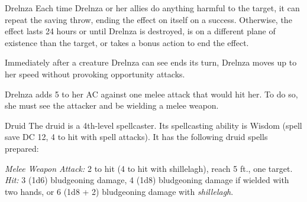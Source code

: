 \documentclass[10pt,a4paper,twoside,bg=print,twocolumn,openany,nodeprecatedcode]{dndbook}
\begin{document}
\begin{DndMonster}[float=t]{Drelnza}
Each time Drelnza or her allies do anything harmful to the target, it can repeat the saving throw, ending the effect on itself on a success. Otherwise, the effect lasts 24 hours or until Drelnza is destroyed, is on a different plane of existence than the target, or takes a bonus action to end the effect.

Immediately after a creature Drelnza can see ends its turn, Drelnza moves up to her speed without provoking opportunity attacks.

Drelnza adds 5 to her AC against one melee attack that would hit her. To do so, she must see the attacker and be wielding a melee weapon.

\end{DndMonster}



\begin{DndMonster}[float=t]{Druid}
\DndMonsterBasics[
armor-class = {11 (16 with \textit{barkskin})},
hit-points = {\DndDice{5d8 + 5}},
speed = {30 ft.}
]
\DndMonsterAbilityScores[
 str = 10,
 dex = 12,
 con = 13,
 int = 12,
 wis = 15,
 cha = 11
]
\DndMonsterDetails[
skills = {Medicine +4, Nature +3, Perception +4},
languages = {Druidic plus any two languages},
challenge = 2,
]
The druid is a 4th-level spellcaster. Its spellcasting ability is Wisdom (spell save DC 12, 4 to hit with spell attacks). It has the following druid spells prepared:
\begin{DndMonsterSpells}
\end{DndMonsterSpells}
\textsl{Melee Weapon Attack:} 2 to hit (4 to hit with shillelagh), reach 5 ft., one target. \textsl{Hit:} 3 (1d6) bludgeoning damage, 4 (1d8) bludgeoning damage if wielded with two hands, or 6 (1d8 + 2) bludgeoning damage with \textit{shillelagh}.

\end{DndMonster}
\end{document}
